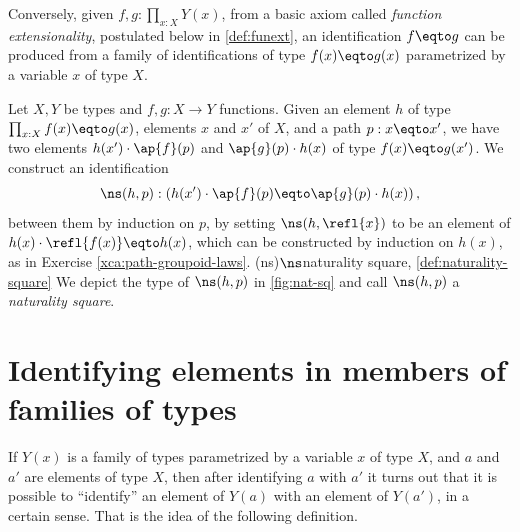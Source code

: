 Conversely, given $f,g:\prod_{x:X} Y(x)$,
from a basic axiom called \emph{function extensionality},%
postulated below in \cref{def:funext}, an identification $f \eqto g$
can be produced from a family of identifications of type $f(x) \eqto g(x)$
parametrized by a variable $x$ of type $X$.

\begin{definition}\label{def:naturality-square}
Let $X,Y$ be types and $f,g: X\to Y$ functions.
Given an element $h$ of type $\prod_{x:X} f(x) \eqto g(x)$, elements $x$ and $x'$ of $X$, and a path $p: x \eqto x'$,
we have two elements $h(x')\cdot \ap{f}(p)$ and $\ap{g}(p)\cdot h(x)$ of type $f(x) \eqto g(x')$.
We construct an identification
\[
  \ns(h,p): \left(h(x')\cdot \ap{f}(p) \eqto \ap{g}(p)\cdot h(x)\right),
\]
between them by induction on $p$, by setting $\ns(h,\refl{x})$ to be an
element of $h(x) \cdot \refl{f(x)} \eqto h(x)$, which can be constructed by
induction on $h(x)$, as in Exercise \ref{xca:path-groupoid-laws}.%
\glossary(ns){$\protect\ns$}{naturality square, \cref{def:naturality-square}}
We depict the type of $\ns(h,p)$ in \cref{fig:nat-sq}
and call $\ns(h,p)$ a \emph{naturality square}.
\end{definition}
\begin{marginfigure}
\caption{\label{fig:nat-sq}Illustration of \cref{def:naturality-square}.} 
\end{marginfigure}


\section{Identifying elements in members of families of types}

If $Y(x)$ is a family of types parametrized by a variable $x$ of type $X$, and $a$ and $a'$ are elements of type $X$, then after identifying $a$
with $a'$ it turns out that it is possible to ``identify'' an element of $Y(a)$ with an element of $Y(a')$, in a certain sense.  That is the
idea of the following definition.

